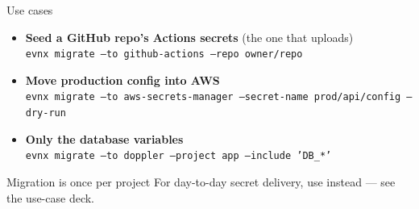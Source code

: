 \begin{frame}{Use cases}
  \begin{itemize}
    \item \textbf{Seed a GitHub repo's Actions secrets} (the one that uploads)\\
      {\footnotesize\texttt{evnx migrate --to github-actions --repo owner/repo}}
    \item \textbf{Move production config into AWS}\\
      {\footnotesize\texttt{evnx migrate --to aws-secrets-manager --secret-name prod/api/config --dry-run}}
    \item \textbf{Only the database variables}\\
      {\footnotesize\texttt{evnx migrate --to doppler --project app --include 'DB\_*'}}
  \end{itemize}

  \vspace{0.8em}
  \begin{block}{Migration is once per project}
    For day-to-day secret delivery, use  instead — see the
    use-case deck.
  \end{block}
\end{frame}
